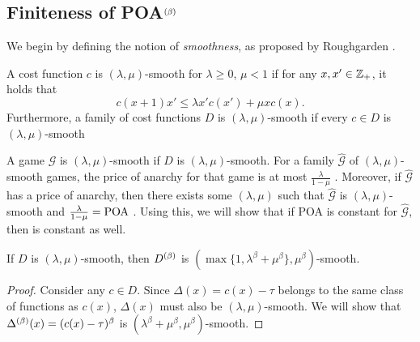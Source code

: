 \documentclass[twoside]{article}
\begin{document}
\begin{multicols}{2}
\section{Finiteness of POA$^{(\beta)}$} \label{sec:ubl}
We begin by defining the notion of \textit{smoothness}, as proposed by
Roughgarden \cite{Roughgarden2012}.
\begin{defn}
  A cost function $c$ is $(\lambda,\mu)$-smooth for $\lambda \ge 0$, $\mu < 1$
  if for any $x,x' \in \mathbb{Z}_+$, it holds that
  \begin{equation}
    c(x+1) x' \le \lambda x' c(x') + \mu x c(x).
    \label{eq:lms1}
  \end{equation}
  Furthermore, a family of cost functions $D$ is $(\lambda,\mu)$-smooth if every
  $c \in D$ is $(\lambda,\mu)$-smooth
\end{defn}A game $\mathcal{G}$ is $(\lambda,\mu)$-smooth if $D$ is $(\lambda,\mu)$-smooth.
For a family $\hat{\mathcal{G}}$ of $(\lambda,\mu)$-smooth games, the price of
anarchy for that game is at most $\frac{\lambda}{1-\mu}$ \cite{Roughgarden2012}.
Moreover, if $\hat{\mathcal{G}}$ has a price of anarchy, then there exists
some $(\lambda,\mu)$ such that $\hat{\mathcal{G}}$ is $(\lambda,\mu)$-smooth and
$\frac{\lambda}{1-\mu} = \text{POA}$ \cite{Roughgarden2012}. Using this, we will show
that if POA is constant for $\hat{\mathcal{G}}$, then \poab is constant as well.

\begin{thm} \label{thm:smooth}
  If $D$ is $(\lambda,\mu)$-smooth, then $D^{(\beta)}$ is $(\max\{1,\lambda^\beta +
  \mu^\beta\},\mu^\beta)$-smooth.
\end{thm}
\begin{proof}
  Consider any $c \in D$. Since $\Delta(x) = c(x) - \tau$ belongs to the same
  class of functions as $c(x)$, $\Delta(x)$ must also be $(\lambda,\mu)$-smooth.
  We will show that $\Delta^{(\beta)}(x) = (c(x) - \tau)^\beta$ is $(\lambda^\beta +
  \mu^\beta,\mu^\beta)$-smooth.


\end{proof}
\end{multicols}
\end{document}
